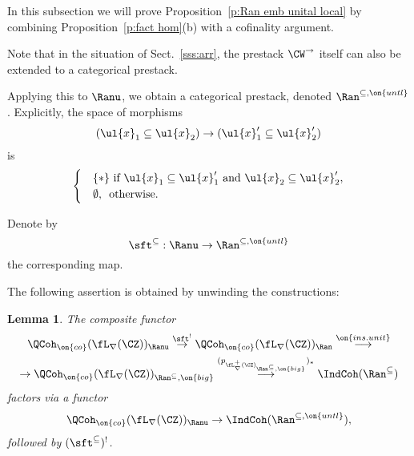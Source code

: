 \documentclass[9pt]{amsart}
\newtheorem{lem}[subsubsection]{Lemma}
\theoremstyle{remark}
\theoremstyle{definition}
\theoremstyle{remark}
\newcommand{\secref}[1]{Sect.~\ref{#1}}
\newcommand{\propref}[1]{Proposition~\ref{#1}}
\numberwithin{equation}{section}
\begin{document}
%
%
%


In this subsection we will prove \propref{p:Ran emb unital local} by combining \propref{p:fact hom}(b) with a 
cofinality argument.

\sssec{}

Note that in the situation of \secref{sss:arr}, the prestack $\CW^\to$ itself can also be extended to a categorical
prestack.

\medskip

Applying this to $\Ranu$, we obtain a categorical prestack, denoted $\Ran^{\subseteq,\on{untl}}$. Explicitly, the space of morphisms 
$$(\ul{x}_1\subseteq \ul{x}_2)\to (\ul{x}'_1\subseteq \ul{x}'_2)$$
is 
$$
\begin{cases} 
&\{*\} \text{ if } \ul{x}_1\subseteq \ul{x}'_1 \text{ and } \ul{x}_2\subseteq \ul{x}'_2,\\
&\emptyset,\, \text{ otherwise}.
\end{cases}
$$

\medskip

Denote by
$$\sft^{\subseteq}:\Ranu\to \Ran^{\subseteq,\on{untl}}$$
the corresponding map.

\sssec{}

The following assertion is obtained by unwinding the constructions:

\begin{lem} \label{l:inherit}
The composite functor
\begin{multline*} 
\QCoh_{\on{co}}(\fL_\nabla(\CZ))_\Ranu\overset{\sft^!}\to \QCoh_{\on{co}}(\fL_\nabla(\CZ))_\Ran \overset{\on{ins.unit}}\longrightarrow \\
\to \QCoh_{\on{co}}(\fL_\nabla(\CZ))_{\Ran^{\subseteq},\on{big}} \overset{(p_{\fL^+_\nabla(\CZ)_{\Ran^{\subseteq},\on{big}}})_*}\longrightarrow \IndCoh(\Ran^{\subseteq})
\end{multline*}
factors via a functor
$$\QCoh_{\on{co}}(\fL_\nabla(\CZ))_\Ranu\to \IndCoh(\Ran^{\subseteq,\on{untl}}),$$
followed by $(\sft^{\subseteq})^!$.
\end{lem}
\end{document}

